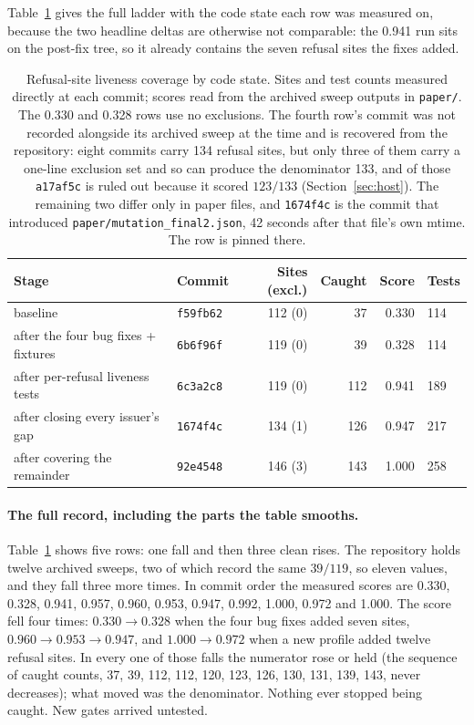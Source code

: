 \documentclass[11pt]{article}
\begin{document}
Table~\ref{tab:ladder} gives the full ladder with the code state each row was measured on,
because the two headline deltas are otherwise not comparable: the 0.941 run sits on the
post-fix tree, so it already contains the seven refusal sites the fixes added.

\begin{table}[ht]
\centering
\caption{Refusal-site liveness coverage by code state. Sites and test counts measured
directly at each commit; scores read from the archived sweep outputs in \texttt{paper/}.
The 0.330 and 0.328 rows use no exclusions. The fourth row's commit was not recorded
alongside its archived sweep at the time and is recovered from the repository: eight
commits carry 134 refusal sites, but only three of them carry a one-line exclusion set and
so can produce the denominator 133, and of those \texttt{a17af5c} is ruled out because it
scored $123/133$ (Section~\ref{sec:host}). The remaining two differ only in paper files, and
\texttt{1674f4c} is the commit that introduced \texttt{paper/mutation\_final2.json}, 42
seconds after that file's own mtime. The row is pinned there.}
\label{tab:ladder}
\begin{tabular}{llrrrl}
\toprule
Stage & Commit & Sites (excl.) & Caught & Score & Tests \\
\midrule
baseline                          & \texttt{f59fb62} & 112 (0) & 37  & 0.330 & 114 \\
after the four bug fixes + fixtures & \texttt{6b6f96f} & 119 (0) & 39  & 0.328 & 114 \\
after per-refusal liveness tests  & \texttt{6c3a2c8} & 119 (0) & 112 & 0.941 & 189 \\
after closing every issuer's gap  & \texttt{1674f4c} & 134 (1) & 126 & 0.947 & 217 \\
after covering the remainder      & \texttt{92e4548} & 146 (3) & 143 & 1.000 & 258 \\
\bottomrule
\end{tabular}
\end{table}

\paragraph{The full record, including the parts the table smooths.} Table~\ref{tab:ladder}
shows five rows: one fall and then three clean rises. The repository holds twelve archived
sweeps, two of which record the same $39/119$, so eleven values, and they fall three more
times. In commit order the measured scores are 0.330, 0.328, 0.941, 0.957, 0.960,
0.953, 0.947, 0.992, 1.000, 0.972 and 1.000. The score fell four times: $0.330 \rightarrow
0.328$ when the four bug fixes added seven sites, $0.960 \rightarrow
0.953 \rightarrow 0.947$, and $1.000 \rightarrow 0.972$ when a new profile added twelve
refusal sites. In every one of those falls the numerator rose or held (the sequence of
caught counts, 37, 39, 112, 112, 120, 123, 126, 130, 131, 139, 143, never decreases); what
moved was the denominator. Nothing ever stopped being caught. New gates arrived untested.
\end{document}
